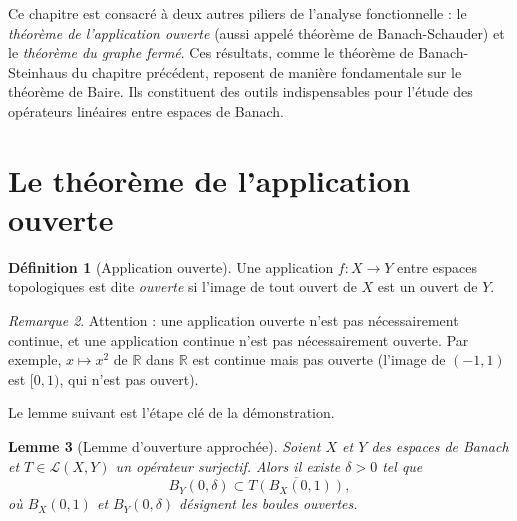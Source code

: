 \documentclass[a4paper,12pt]{book}
\newcommand{\R}{\mathbb{R}}
\theoremstyle{definition}
\newtheorem{definition}{Définition}[chapter]
\theoremstyle{plain}
\newtheorem{lemme}[definition]{Lemme}
\theoremstyle{remark}
\newtheorem{remarque}[definition]{Remarque}
\begin{document}
\vspace{1em}

Ce chapitre est consacré à deux autres piliers de l'analyse fonctionnelle :
le \emph{théorème de l'application ouverte}
(aussi appelé théorème de Banach-Schauder)
et le \emph{théorème du graphe fermé}.
Ces résultats, comme le théorème de Banach-Steinhaus du chapitre précédent,
reposent de manière fondamentale sur le théorème de Baire.
Ils constituent des outils indispensables pour l'étude des opérateurs
linéaires entre espaces de Banach.

\section{Le théorème de l'application ouverte}
\label{sec:application-ouverte}


\begin{definition}[Application ouverte]
\label{def:application-ouverte}
Une application $f : X \to Y$ entre espaces topologiques est dite
\emph{ouverte} si l'image de tout ouvert
de $X$ est un ouvert de $Y$.
\end{definition}

\begin{remarque}
\label{rem:ouverte-vs-continue}
Attention : une application ouverte n'est pas nécessairement continue,
et une application continue n'est pas nécessairement ouverte.
Par exemple, $x \mapsto x^2$ de $\R$ dans $\R$ est continue mais pas ouverte
(l'image de $(-1,1)$ est $[0,1)$, qui n'est pas ouvert).
\end{remarque}

Le lemme suivant est l'étape clé de la démonstration.

\begin{lemme}[Lemme d'ouverture approchée]
\label{lem:ouverture-approchee}
Soient $X$ et $Y$ des espaces de Banach et $T \in \mathcal{L}(X,Y)$
un opérateur surjectif. Alors il existe $\delta > 0$ tel que
\[
  B_Y(0, \delta) \subset \overline{T(B_X(0,1))},
\]
où $B_X(0,1)$ et $B_Y(0,\delta)$ désignent les boules ouvertes.
\end{lemme}
\end{document}
